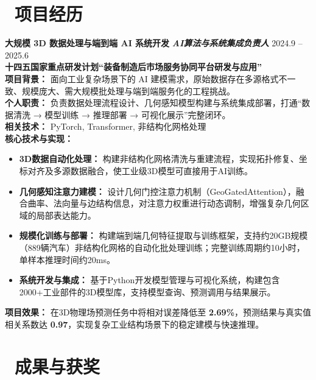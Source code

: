 \documentclass[11pt]{article}
\begin{document}
\section{\makebox[\widthof{\faBriefcase}][c]{\color{CVBlue}%
\faBriefcase}\ 项目经历}

\textbf{大规模 3D 数据处理与端到端 AI 系统开发} 
\textit{\textbf{AI算法与系统集成负责人}}
\hfill 2024.9 -- 2025.6\\[0.2em]
\textcolor{CVBlue}{\textbf{十四五国家重点研发计划``装备制造后市场服务协同平台研发与应用''}}\\
\textbf{项目背景：}  面向工业复杂场景下的 AI 建模需求，原始数据存在多源格式不一致、规模庞大、需大规模批处理与端到端服务化的工程挑战。\\
\textbf{个人职责：} 负责数据处理流程设计、几何感知模型构建与系统集成部署，打通“数据清洗 → 模型训练 → 推理部署 → 可视化展示”完整闭环。\\
\textbf{相关技术：} PyTorch, Transformer, 非结构化网格处理\\
\textbf{核心技术与实现：}
\begin{itemize}[leftmargin=1.6em]
    \item \textbf{3D数据自动化处理：} 构建非结构化网格清洗与重建流程，实现拓扑修复、坐标对齐及多源数据融合，使工业级3D模型可直接用于AI训练。
    \item \textbf{几何感知注意力建模：} 设计几何门控注意力机制（GeoGatedAttention），融合曲率、法向量与边结构信息，对注意力权重进行动态调制，增强复杂几何区域的局部表达能力。
    \item \textbf{规模化训练与部署：} 构建端到端几何特征提取与训练框架，支持约20GB规模（889辆汽车）非结构化网格的自动化批处理训练；完整训练周期约10小时，单样本推理时间约20ms。
    \item \textbf{系统开发与集成：} 基于Python开发模型管理与可视化系统，构建包含2000+工业部件的3D模型库，支持模型查询、预测调用与结果展示。
\end{itemize}
\textbf{项目效果：} 在3D物理场预测任务中将相对误差降低至 \textbf{2.69\%}，预测结果与真实值相关系数达 \textbf{0.97}，实现复杂工业结构场景下的稳定建模与快速推理。

\section{
    \makebox[\widthof{\faTrophy}][c]
    {\color{CVBlue}\faTrophy}\ 成果与获奖
}
\end{document}
